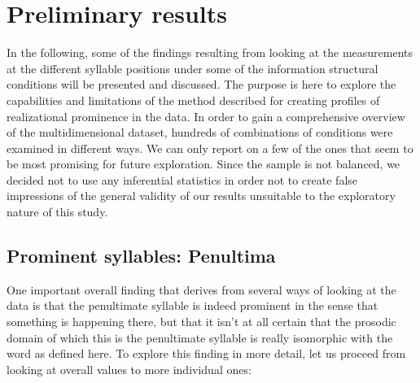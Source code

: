 \documentclass[output=paper]{LSP/langsci}
\begin{document}
\section{Preliminary results}
In the following, some of the findings resulting from looking at the measurements at the different syllable positions under some of the information structural conditions will be presented and discussed. The purpose is here to explore the capabilities and limitations of the method described for creating profiles of realizational prominence in the data. In order to gain a comprehensive overview of the multidimensional dataset, hundreds of combinations of conditions were examined in different ways. We can only report on a few of the ones that seem to be most promising for future exploration. Since the sample is not balanced, we decided not to use any inferential statistics in order not to create false impressions of the general validity of our results unsuitable to the exploratory nature of this study. 

\subsection{Prominent syllables: Penultima}
One important overall finding that derives from several ways of looking at the data is that the penultimate syllable is indeed prominent in the sense that something is happening there, but that it isn’t at all certain that the prosodic domain of which this is the penultimate syllable is really isomorphic with the word as defined here. To explore this finding in more detail, let us proceed from looking at overall values to more individual ones:
\end{document}
